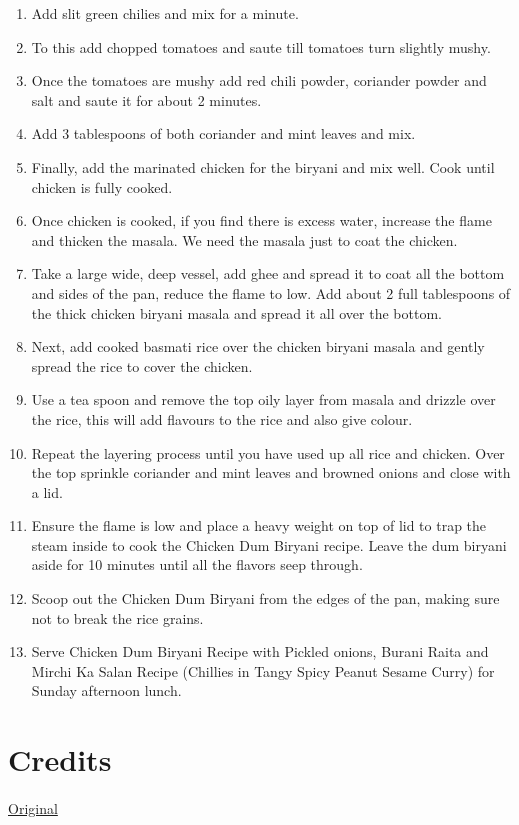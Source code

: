 \documentclass{recipe}
\begin{document}
\begin{enumerate}
            \item Add slit green chilies and mix for a minute.
            
            \item To this add chopped tomatoes and saute till tomatoes turn slightly mushy.
            
            \item Once the tomatoes are mushy add red chili powder, coriander powder and salt and saute it for about 2 minutes.
            
            \item Add 3 tablespoons of both coriander and mint leaves and mix.
            
            \item Finally, add  the marinated chicken for the biryani and mix well. Cook until chicken is fully cooked. 
            
            \item Once chicken is cooked, if you find there is excess water, increase the flame and thicken the masala. We need the masala just to coat the chicken.
            
            \item Take a large wide, deep vessel, add ghee and spread it to coat all the bottom and sides of the pan, reduce the flame to low. Add about 2 full tablespoons of the thick chicken biryani masala and spread it all over the bottom.
            
            \item Next, add cooked basmati rice over the chicken biryani masala and gently spread the rice to cover the chicken. 
            
            \item Use a tea spoon and remove the top oily layer from masala and drizzle over the rice, this will add flavours to the rice and also give colour.
            
            \item Repeat the layering process until you have used up all rice and chicken. Over the top sprinkle coriander and mint leaves and browned onions and close with a lid.
            
            \item Ensure the flame is low and place a heavy weight on top of lid to trap the steam inside to cook the Chicken Dum Biryani recipe. Leave the dum biryani aside for 10 minutes until all the flavors seep through.
            
            \item Scoop out the Chicken Dum Biryani from the edges of the pan, making sure not to break the rice grains.
            
            \item Serve Chicken Dum Biryani Recipe with Pickled onions, Burani Raita and Mirchi Ka Salan Recipe (Chillies in Tangy Spicy Peanut Sesame Curry) for Sunday afternoon lunch.
        \end{enumerate}
    \section{Credits}
            \paragraph{} \href{https://www.archanaskitchen.com/chicken-dum-biryani-recipe}{Original}
       
\end{document}
